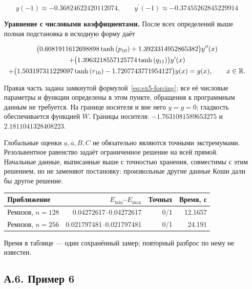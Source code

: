 \begin{equation}
y(-1)\approx-0.36824622420112074,\qquad y^\prime(-1)\approx-0.37455262845229914
\end{equation}


\noindent\textbf{Уравнение с числовыми коэффициентами.} После всех определений выше полная подстановка в исходную форму даёт

\begin{multline}\label{eq:ex5-ode}\bigl(0.6081911612698898 \tanh{\left(p_{10} \right)} + 1.3923314952865382\bigr)y^{\prime\prime}(x)\\+\bigl(1.3963218557125774 \tanh{\left(q_{11} \right)}\bigr)y^\prime(x)\\+\bigl(1.503197311229097 \tanh{\left(r_{10} \right)} - 1.7207743771954127\bigr)y(x)=g(x),\qquad x\in\mathbb R.\end{multline}

Правая часть задана замкнутой формулой~\eqref{eq:ex5-forcing}; все её числовые параметры и функции определены в этом пункте, обращения к программным данным не требуется. На границе носителя и вне него $y=g=0$; гладкость обеспечивается функцией $W$. Границы носителя: $-1.7631081589653275$ и $2.1811041328408223$.

Глобальные оценки $\underline a,\overline a,B,C$ не обязательно являются точными экстремумами. Резольвентное равенство задаёт ограниченное решение на всей прямой. Начальные данные, выписанные выше с точностью хранения, совместимы с этим решением, но не заменяют постановку: произвольные другие данные Коши дали бы другое решение.

\begin{center}\label{tab:ex5}\begin{tabular}{lrrr}\toprule Приближение&$E_{\min}$--$E_{\max}$&Точных&Время, с\\\midrule

Ремизов, $n=128$&0.04272617--0.04272617&0/1&12.1657\\

Ремизов, $n=256$&0.021797481--0.021797481&0/1&24.191\\

\bottomrule\end{tabular}\end{center}

Время в таблице --- один сохранённый замер; повторный разброс по нему не известен.

\clearpage

\subsection*{А.6. Пример 6}\label{app:ex6}

